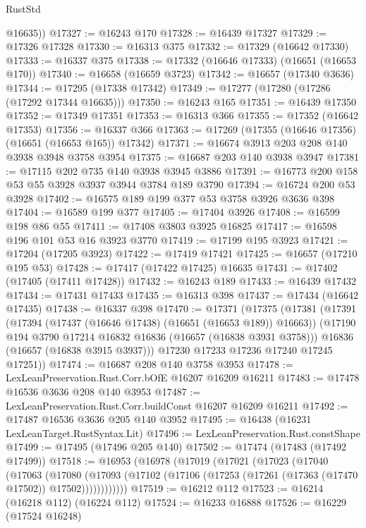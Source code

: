 \begin{lexlean}{RustStd}
\begin{coremodule}
        @16635))
@17327 := @16243 @170
@17328 := @16439 @17327
@17329 := @17326 @17328
@17330 := @16313 @375
@17332 := @17329 (@16642 @17330)
@17333 := @16337 @375
@17338 := @17332 (@16646 @17333) (@16651 (@16653 @170))
@17340 := @16658 (@16659 @3723)
@17342 := @16657 (@17340 @3636)
@17344 := @17295 (@17338 @17342)
@17349 := @17277 (@17280 (@17286 (@17292 @17344 @16635)))
@17350 := @16243 @165
@17351 := @16439 @17350
@17352 := @17349 @17351
@17353 := @16313 @366
@17355 := @17352 (@16642 @17353)
@17356 := @16337 @366
@17363 := @17269 (@17355 (@16646 @17356) (@16651 (@16653 @165)) @17342)
@17371 := @16674 @3913 @203 @208 @140 @3938 @3948 @3758 @3954
@17375 := @16687 @203 @140 @3938 @3947
@17381 := @17115 @202 @735 @140 @3938 @3945 @3886
@17391 := @16773 @200 @158 @53 @55 @3928 @3937 @3944 @3784 @189 @3790
@17394 := @16724 @200 @53 @3928
@17402 := @16575 @189 @199 @377 @53 @3758 @3926 @3636 @398
@17404 := @16589 @199 @377
@17405 := @17404 @3926
@17408 := @16599 @198 @86 @55
@17411 := @17408 @3803 @3925 @16825
@17417 := @16598 @196 @101 @53 @16 @3923 @3770
@17419 := @17199 @195 @3923
@17421 := @17204 (@17205 @3923)
@17422 := @17419 @17421
@17425 := @16657 (@17210 @195 @53)
@17428 := @17417 (@17422 @17425) @16635
@17431 := @17402 (@17405 (@17411 @17428))
@17432 := @16243 @189
@17433 := @16439 @17432
@17434 := @17431 @17433
@17435 := @16313 @398
@17437 := @17434 (@16642 @17435)
@17438 := @16337 @398
@17470 := @17371
    (@17375
      (@17381
        (@17391
          (@17394 (@17437 (@16646 @17438) (@16651 (@16653 @189)) @16663))
          (@17190 @194 @3790 @17214 @16832 @16836 (@16657 (@16838 @3931 @3758)))
          @16836
          (@16657 (@16838 @3915 @3937)))
        @17230
        @17233
        @17236
        @17240
        @17245
        @17251))
@17474 := @16687 @208 @140 @3758 @3953
@17478 := LexLeanPreservation.Rust.Corr.bOfE @16207 @16209 @16211
@17483 := @17478 @16536 @3636 @208 @140 @3953
@17487 := LexLeanPreservation.Rust.Corr.buildConst @16207 @16209 @16211
@17492 := @17487 @16536 @3636 @205 @140 @3952
@17495 := @16438 (@16231 LexLeanTarget.RustSyntax.Lit)
@17496 := LexLeanPreservation.Rust.constShape
@17499 := @17495 (@17496 @205 @140)
@17502 := @17474 (@17483 (@17492 @17499))
@17518 := @16953
    (@16978
      (@17019
        (@17021
          (@17023
            (@17040
              (@17063
                (@17080
                  (@17093
                    (@17102 (@17106 (@17253 (@17261 (@17363 (@17470 @17502)) @17502))))))))))))
@17519 := @16212 @112
@17523 := @16214 (@16218 @112) (@16224 @112)
@17524 := @16233 @16888
@17526 := @16229 (@17524 @16248)

\end{coremodule}
\end{lexlean}
